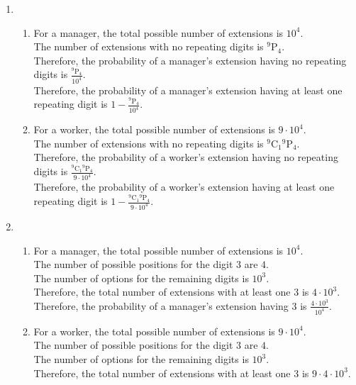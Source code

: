 \documentclass[fleqn, a4paper, 11pt, oneside]{amsart}
\theoremstyle{definition}
\theoremstyle{theorem}
\newcommand*{\perm}[2]{{}^{#1}\mathrm{P}_{#2}}%
\newcommand*{\comb}[2]{{}^{#1}\mathrm{C}_{#2}}%
\begin{document}
\begin{solution}
	\begin{enumerate}[leftmargin=*]
		\item
			\begin{enumerate}
				\item
					For a manager, the total possible number of extensions is $10^4$.\\
					The number of extensions with no repeating digits is $\perm{9}{4}$.\\
					Therefore, the probability of a manager's extension having no repeating digits is $\frac{\perm{9}{4}}{10^4}$.\\
					Therefore, the probability of a manager's extension having at least one repeating digit is $1 - \frac{\perm{9}{4}}{10^4}$.
				\item
					For a worker, the total possible number of extensions is $9 \cdot 10^4$.\\
					The number of extensions with no repeating digits is $\comb{9}{1} \perm{9}{4}$.\\
					Therefore, the probability of a worker's extension having no repeating digits is $\frac{\comb{9}{1} \perm{9}{4}}{9 \cdot 10^4}$.\\
					Therefore, the probability of a worker's extension having at least one repeating digit is $1 - \frac{\comb{9}{1} \perm{9}{4}}{9 \cdot 10^4}$.
			\end{enumerate}
		\item
			\begin{enumerate}
				\item
					For a manager, the total possible number of extensions is $10^4$.\\
					The number of possible positions for the digit $3$ are $4$.\\
					The number of options for the remaining digits is $10^3$.\\
					Therefore, the total number of extensions with at least one $3$ is $4 \cdot 10^3$.\\
					Therefore, the probability of a manager's extension having $3$ is $\frac{4 \cdot 10^3}{10^4}$.
				\item
					For a worker, the total possible number of extensions is $9 \cdot 10^4$.\\
					The number of possible positions for the digit $3$ are $4$.\\
					The number of options for the remaining digits is $10^3$.\\
					Therefore, the total number of extensions with at least one $3$ is $9 \cdot 4 \cdot 10^3$.\\

\end{enumerate}
\end{enumerate}
\end{solution}
\end{document}
